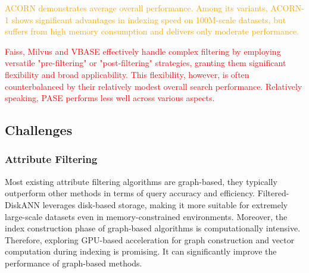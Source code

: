 \documentclass[sigconf, nonacm]{acmart}
\begin{document}
{\textcolor{orange}{
ACORN demonstrates average overall performance. Among its variants, ACORN-1 shows significant advantages in indexing speed on 100M-scale datasets, but suffers from high memory consumption and delivers only moderate performance.}

\textcolor{red}{
Faiss, Milvus and VBASE effectively handle complex filtering by employing versatile "pre-filtering" or "post-filtering" strategies, granting them significant flexibility and broad applicability. This flexibility, however, is often counterbalanced by their relatively modest overall search performance. Relatively speaking, PASE performs less well across various aspects.}
	
	\subsection{Challenges}
	\subsubsection{Attribute Filtering}
	Most existing attribute filtering algorithms are graph-based, they typically outperform other methods in terms of query accuracy and efficiency. Filtered-DiskANN leverages disk-based storage, making it more suitable for extremely large-scale datasets even in memory-constrained environments. Moreover, the index construction phase of graph-based algorithms is computationally intensive. Therefore, exploring GPU-based acceleration for graph construction and vector computation during indexing is promising. It can significantly improve the performance of graph-based methods.
	
}
\end{document}
